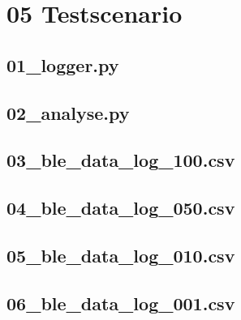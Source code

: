\newpage 

\section{05 Testscenario}
\label{app:Odner6}
\subsection{01\_logger.py}
\label{app:File61_lg}
\subsection{02\_analyse.py}
\label{app:File62_an}
\subsection{03\_ble\_data\_log\_100.csv}
\label{app:File63_100ms}
\subsection{04\_ble\_data\_log\_050.csv}
\label{app:File64_50ms}
\subsection{05\_ble\_data\_log\_010.csv}
\label{app:File65_10ms}
\subsection{06\_ble\_data\_log\_001.csv}
\label{app:File66_1ms}
